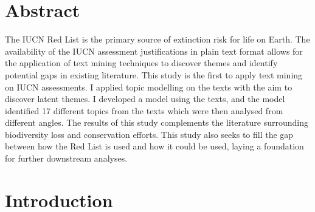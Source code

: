 \documentclass[a4paper, 11pt]{article}
\begin{document}

\tableofcontents
\pagebreak
\newpage


\cleardoublepage{}


\section*{Abstract}
The IUCN Red List is the primary source of extinction risk for life on Earth. The availability of the IUCN assessment justifications in plain text format allows for the application of text mining techniques to discover themes and identify potential gaps in existing literature. This study is the first to apply text mining on IUCN assessments. I applied topic modelling on the texts with the aim to discover latent themes. I developed a model using the texts, and the model identified 17 different topics from the texts which were then analysed from different angles. The results of this study complements the literature surrounding biodiversity loss and conservation efforts. This study also seeks to fill the gap between how the Red List is used and how it could be used, laying a foundation for further downstream analyses.
\pagebreak

\section{Introduction}

\pagebreak
\end{document}
